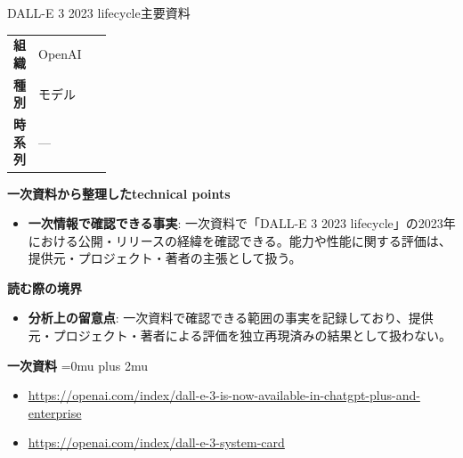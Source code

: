\begin{technicalnote}{DALL-E 3 2023 lifecycle}{主要資料}
\begingroup
\begin{tabularx}{\linewidth}{@{}>{\bfseries}p{0.22\linewidth}X@{}}
組織 & OpenAI \\
種別 & モデル \\
時系列 & — \\
\end{tabularx}
\smallskip
{\bfseries 一次資料から整理したtechnical points}
\begin{itemize}[leftmargin=1.5em,itemsep=0.35em]
\item \textbf{一次情報で確認できる事実}: 一次資料で「DALL-E 3 2023 lifecycle」の2023年における公開・リリースの経緯を確認できる。能力や性能に関する評価は、提供元・プロジェクト・著者の主張として扱う。
\end{itemize}
\begin{minipage}{\linewidth}
{\bfseries 読む際の境界}
\begin{itemize}[leftmargin=1.5em,itemsep=0.35em]
\item \textbf{分析上の留意点}: 一次資料で確認できる範囲の事実を記録しており、提供元・プロジェクト・著者による評価を独立再現済みの結果として扱わない。
\end{itemize}
\begin{samepage}
{\bfseries 一次資料}
\begingroup\sloppy
\Urlmuskip=0mu plus 2mu\relax
\begin{itemize}[leftmargin=1.5em,itemsep=0.25em]
\item {\scriptsize\url{https://openai.com/index/dall-e-3-is-now-available-in-chatgpt-plus-and-enterprise}}
\item {\scriptsize\url{https://openai.com/index/dall-e-3-system-card}}
\end{itemize}
\endgroup
\end{samepage}
\end{minipage}
\endgroup
\end{technicalnote}
\medskip

